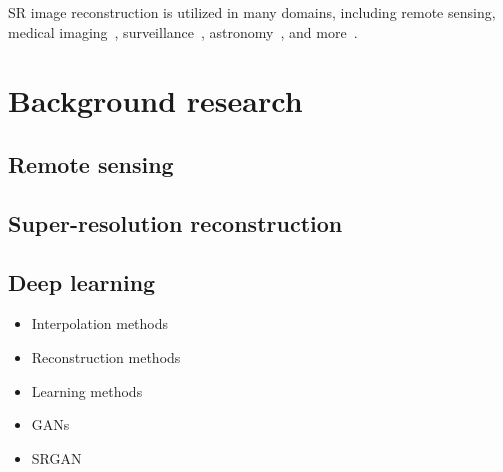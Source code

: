 SR image reconstruction is utilized in many domains, including remote sensing, medical imaging~\cite{superResMedicalImaging}, surveillance~\cite{superResSurveillance}, astronomy~\cite{superResAstronomy}, and more~\cite{superResUses}.

\section{Background research}

\subsection{Remote sensing}

\subsection{Super-resolution reconstruction}

\subsection{Deep learning}



\begin{itemize}
    \item Interpolation methods
    \item Reconstruction methods
    \item Learning methods
    \item GANs
    \item SRGAN
\end{itemize}